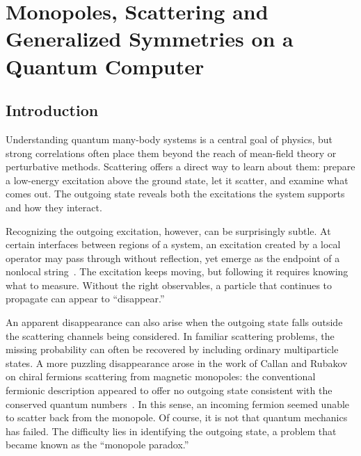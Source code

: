 
\ifpdf
    \graphicspath{{Chapter5/Figs/Raster/}{Chapter5/Figs/PDF/}{Chapter5/Figs/}{Chapter5/Quantinuum/}{Chapter5/Quantinuum/figs/}}
\else
    \graphicspath{{Chapter5/Figs/Vector/}{Chapter5/Figs/}{Chapter5/Quantinuum/}{Chapter5/Quantinuum/figs/}}
\fi

\chapter{Monopoles, Scattering and Generalized Symmetries on a Quantum Computer}
\label{section:duality_scattering}

\section{Introduction}
Understanding quantum many-body systems is a central goal of physics, but strong correlations often place them beyond the reach of mean-field theory or perturbative methods. Scattering offers a direct way to learn about them: prepare a low-energy excitation above the ground state, let it scatter, and examine what comes out. The outgoing state reveals both the excitations the system supports and how they interact.

Recognizing the outgoing excitation, however, can be surprisingly subtle. At certain interfaces between regions of a system, an excitation created by a local operator may pass through without reflection, yet emerge as the endpoint of a nonlocal string~\cite{ueda2025}. The excitation keeps moving, but following it requires knowing what to measure. Without the right observables, a particle that continues to propagate can appear to ``disappear.''

An apparent disappearance can also arise when the outgoing state falls outside the scattering channels being considered. In familiar scattering problems, the missing probability can often be recovered by including ordinary multiparticle states. A more puzzling disappearance arose in the work of Callan and Rubakov on chiral fermions scattering from magnetic monopoles: the conventional fermionic description appeared to offer no outgoing state consistent with the conserved quantum numbers~\cite{Callan:1982ah,Rubakov:1982fp,Polchinski:fermion_rotor}. In this sense, an incoming fermion seemed unable to scatter back from the monopole. Of course, it is not that quantum mechanics
has failed. The difficulty lies in identifying the outgoing state, a problem that became known as the “monopole paradox.”

